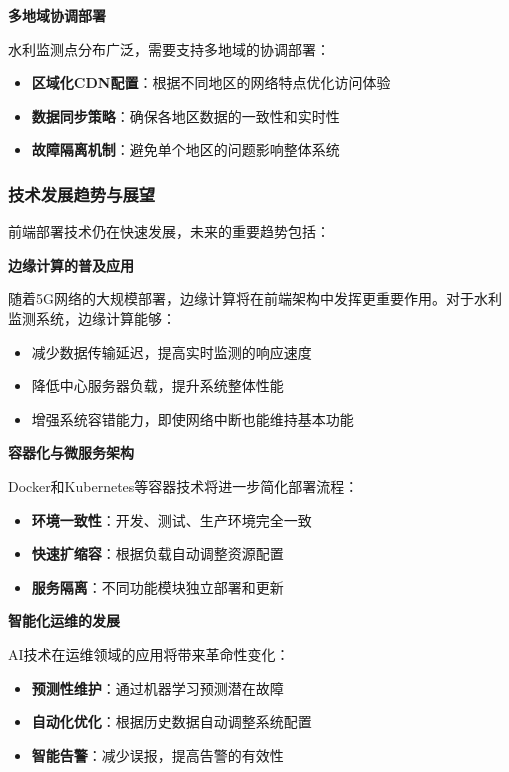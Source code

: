 \textbf{多地域协调部署}

水利监测点分布广泛，需要支持多地域的协调部署：

\begin{itemize}
\tightlist
\item
  \textbf{区域化CDN配置}：根据不同地区的网络特点优化访问体验
\item
  \textbf{数据同步策略}：确保各地区数据的一致性和实时性
\item
  \textbf{故障隔离机制}：避免单个地区的问题影响整体系统
\end{itemize}

\subsubsection{技术发展趋势与展望}\label{ux6280ux672fux53d1ux5c55ux8d8bux52bfux4e0eux5c55ux671b}

前端部署技术仍在快速发展，未来的重要趋势包括：

\textbf{边缘计算的普及应用}

随着5G网络的大规模部署，边缘计算将在前端架构中发挥更重要作用。对于水利监测系统，边缘计算能够：

\begin{itemize}
\tightlist
\item
  减少数据传输延迟，提高实时监测的响应速度
\item
  降低中心服务器负载，提升系统整体性能
\item
  增强系统容错能力，即使网络中断也能维持基本功能
\end{itemize}

\textbf{容器化与微服务架构}

Docker和Kubernetes等容器技术将进一步简化部署流程：

\begin{itemize}
\tightlist
\item
  \textbf{环境一致性}：开发、测试、生产环境完全一致
\item
  \textbf{快速扩缩容}：根据负载自动调整资源配置
\item
  \textbf{服务隔离}：不同功能模块独立部署和更新
\end{itemize}

\textbf{智能化运维的发展}

AI技术在运维领域的应用将带来革命性变化：

\begin{itemize}
\tightlist
\item
  \textbf{预测性维护}：通过机器学习预测潜在故障
\item
  \textbf{自动化优化}：根据历史数据自动调整系统配置
\item
  \textbf{智能告警}：减少误报，提高告警的有效性
\end{itemize}

